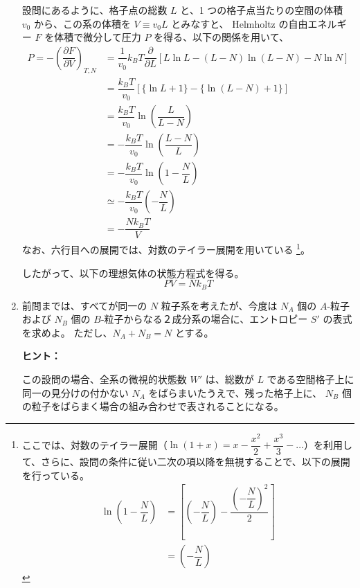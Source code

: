 \documentclass[uplatex,dvipdfmx,a4paper,11pt]{jsarticle}
\begin{document}
\begin{enumerate}
設問にあるように、格子点の総数 $L$ と、1 つの格子点当たりの空間の体積 $v_0$ から、この系の体積を $V \equiv v_0 L$ とみなすと、
Helmholtz の自由エネルギー $F$ を体積で微分して圧力 $P$ を得る、以下の関係を用いて、
\begin{align*}
P = -\left( \dfrac{\partial F}{\partial V} \right)_{T,N} 
	&=
	\dfrac{1}{v_0}  k_B T \dfrac{\partial }{\partial L} \left[ L\ln L - (L-N)\ln (L-N) - N\ln N \right] \\
	&=
	\dfrac{k_B T}{v_0}  \left[ \{\ln L +1\} - \{\ln (L-N) + 1\} \right] \\
	&=
	\dfrac{k_B T}{v_0}  \ln \left(\dfrac{L}{L-N} \right) \\	
	&=
	-\dfrac{k_B T}{v_0}  \ln \left(\dfrac{L-N}{L} \right) \\
	&=
	-\dfrac{k_B T}{v_0}  \ln \left(1-\dfrac{N}{L} \right) \\
	&\simeq
	-\dfrac{k_B T}{v_0} \left(-\dfrac{N}{L} \right) \\
	&= 	-\dfrac{N k_B T}{V}
\end{align*}
なお、六行目への展開では、対数のテイラー展開を用いている
\footnote{
ここでは、対数のテイラー展開（$\ln \left(1 + x \right) = x - \dfrac{x^2}{2} + \dfrac{x^3}{3} -\dots$）を利用して、さらに、設問の条件に従い二次の項以降を無視することで、以下の展開を行っている。
\begin{align*}
\ln \left(1 - \dfrac{N}{L} \right) 
	&= 
	\left[ \left (- \dfrac{N}{L} \right) - \dfrac{\left (- \dfrac{N}{L} \right)^2}{2} \right] \\
	&= \left (- \dfrac{N}{L} \right)
\end{align*}
}。

したがって、以下の理想気体の状態方程式を得る。
\begin{equation*}
PV = N k_B T
\end{equation*}

\newpage

\item
前問までは、すべてが同一の $N$ 粒子系を考えたが、今度は $N_A$ 個の $A$-粒子および $N_B$ 個の $B$-粒子からなる２成分系の場合に、エントロピー $S'$ の表式を求めよ。
ただし、$N_A + N_B = N$ とする。

\vspace{8pt}

\begin{itembox}[l]{{\bf ヒント：}}

この設問の場合、全系の微視的状態数 $W'$ は、総数が $L$ である空間格子上に同一の見分けの付かない $N_A$ をばらまいたうえで、残った格子上に、
$N_B$ 個の粒子をばらまく場合の組み合わせで表されることになる。


\end{itembox}
\end{enumerate}
\end{document}
